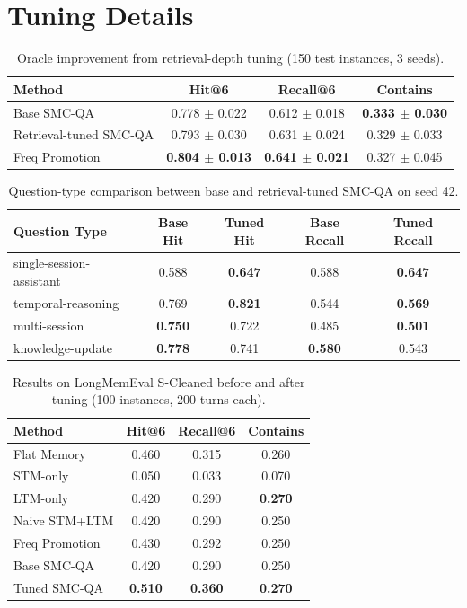 \documentclass{article}
\begin{document}
\section{Tuning Details}
\label{app:tuning}

\begin{table}[H]
\centering
\caption{Oracle improvement from retrieval-depth tuning (150 test instances, 3 seeds).}
\label{tab:retrieval-tuned}
\begin{tabular}{lccc}
\toprule
\textbf{Method} & \textbf{Hit@6} & \textbf{Recall@6} & \textbf{Contains} \\
\midrule
Base SMC-QA & 0.778 $\pm$ 0.022 & 0.612 $\pm$ 0.018 & \textbf{0.333 $\pm$ 0.030} \\
Retrieval-tuned SMC-QA & 0.793 $\pm$ 0.030 & 0.631 $\pm$ 0.024 & 0.329 $\pm$ 0.033 \\
Freq Promotion & \textbf{0.804 $\pm$ 0.013} & \textbf{0.641 $\pm$ 0.021} & 0.327 $\pm$ 0.045 \\
\bottomrule
\end{tabular}
\end{table}

\begin{table}[H]
\centering
\caption{Question-type comparison between base and retrieval-tuned SMC-QA on seed 42.}
\label{tab:question-type}
\begin{tabular}{lcccc}
\toprule
\textbf{Question Type} & \textbf{Base Hit} & \textbf{Tuned Hit} & \textbf{Base Recall} & \textbf{Tuned Recall} \\
\midrule
single-session-assistant & 0.588 & \textbf{0.647} & 0.588 & \textbf{0.647} \\
temporal-reasoning & 0.769 & \textbf{0.821} & 0.544 & \textbf{0.569} \\
multi-session & \textbf{0.750} & 0.722 & 0.485 & \textbf{0.501} \\
knowledge-update & \textbf{0.778} & 0.741 & \textbf{0.580} & 0.543 \\
\bottomrule
\end{tabular}
\end{table}

\begin{table}[H]
\centering
\caption{Results on LongMemEval S-Cleaned before and after tuning (100 instances, 200 turns each).}
\label{tab:scleaned}
\begin{tabular}{lccc}
\toprule
\textbf{Method} & \textbf{Hit@6} & \textbf{Recall@6} & \textbf{Contains} \\
\midrule
Flat Memory & 0.460 & 0.315 & 0.260 \\
STM-only & 0.050 & 0.033 & 0.070 \\
LTM-only & 0.420 & 0.290 & \textbf{0.270} \\
Naive STM+LTM & 0.420 & 0.290 & 0.250 \\
Freq Promotion & 0.430 & 0.292 & 0.250 \\
Base SMC-QA & 0.420 & 0.290 & 0.250 \\
Tuned SMC-QA & \textbf{0.510} & \textbf{0.360} & \textbf{0.270} \\
\bottomrule
\end{tabular}
\end{table}
\end{document}
